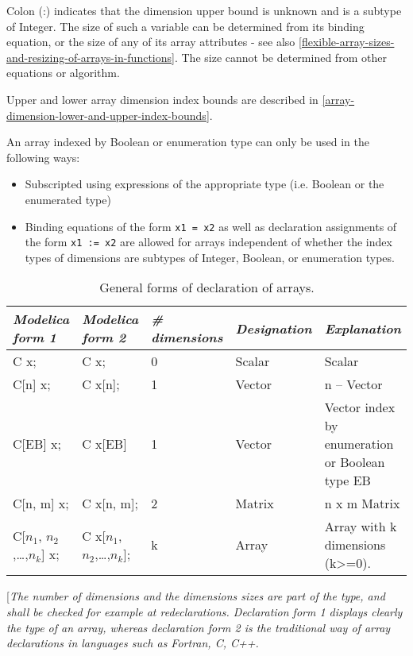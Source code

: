 Colon (:)
indicates that the dimension upper bound is unknown and is a subtype of
Integer. The size of such a variable can be determined from its binding equation, or the size
of any of its array attributes - see also \autoref{flexible-array-sizes-and-resizing-of-arrays-in-functions}.
The size cannot be determined from other equations or algorithm.

Upper and lower array dimension index bounds are described in \autoref{array-dimension-lower-and-upper-index-bounds}.

An array indexed by Boolean or enumeration type can only be used in the
following ways:

\begin{itemize}
\item
  Subscripted using expressions of the appropriate type (i.e. Boolean or
  the enumerated type)
\item
  Binding equations of the form \lstinline!x1 = x2! as well as declaration
  assignments of the form \lstinline!x1 := x2! are allowed for arrays independent of
  whether the index types of dimensions are subtypes of Integer,
  Boolean, or enumeration types.
\end{itemize}

\begin{longtable}{|l|l|l|l|p{4cm}|}
\caption{General forms of declaration of arrays.}\\
\hline
\emph{Modelica form 1} & \emph{Modelica form 2} & \emph{\# dimensions} & \emph{Designation} & \emph{Explanation}\\ \hline
\endhead
C x; & C x; & 0 & Scalar & Scalar\\ \hline
C{[}n{]} x; & C x{[}n{]}; & 1 & Vector & n -- Vector\\ \hline
C{[}EB{]} x; & C x{[}EB{]} & 1 & Vector & Vector index by enumeration or
Boolean type EB\\ \hline
C{[}n, m{]} x; & C x{[}n, m{]}; & 2 & Matrix & n x m
Matrix\\ \hline
C{[}$n_1$, $n_{2}$,\ldots{},$n_k${]} x; & C x{[}$n_1$, $n_2$,\ldots{},$n_k${]}; & k & Array & Array with k dimensions
(k\textgreater{}=0).\\ \hline
\end{longtable}

{[}\emph{The number of dimensions and the dimensions sizes are part of
the type, and shall be checked for example at redeclarations.
Declaration form 1 displays clearly the type of an array, whereas
declaration form 2 is the traditional way of array declarations in
languages such as Fortran, C, C++.}

